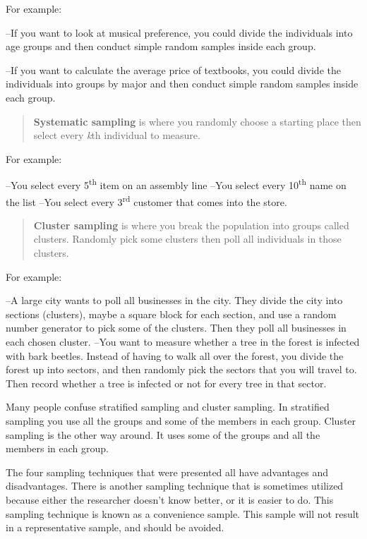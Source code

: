 \documentclass[]{book}
\begin{document}
For example:

--If you want to look at musical preference, you could divide the individuals into age groups and then conduct simple random samples inside each group.

--If you want to calculate the average price of textbooks, you could divide the individuals into groups by major and then conduct simple random samples inside each group.

\begin{quote}
\textbf{Systematic sampling} is where you randomly choose a starting place
then select every \emph{k}th individual to measure.
\end{quote}

For example:

--You select every 5\textsuperscript{th} item on an assembly line
--You select every 10\textsuperscript{th} name on the list
--You select every 3\textsuperscript{rd} customer that comes into the store.

\begin{quote}
\textbf{Cluster sampling} is where you break the population into groups
called clusters. Randomly pick some clusters then poll all individuals in those clusters.
\end{quote}

For example:

--A large city wants to poll all businesses in the city. They divide the city into sections (clusters), maybe a square block for each section, and use a random number generator to pick some of the clusters. Then they poll all businesses in each chosen cluster.
--You want to measure whether a tree in the forest is infected with bark beetles. Instead of having to walk all over the forest, you divide the forest up into sectors, and then randomly pick the sectors that you will travel to. Then record whether a tree is infected or not for every tree in that sector.

Many people confuse stratified sampling and cluster sampling. In stratified sampling you use {all} the groups and {some} of the members in each group. Cluster sampling is the other way around. It uses {some} of the groups and {all} the members in each group.

The four sampling techniques that were presented all have advantages and disadvantages. There is another sampling technique that is sometimes utilized because either the researcher doesn't know better, or it is easier to do. This sampling technique is known as a convenience sample. This sample will not result in a representative sample, and should be avoided.
\end{document}

